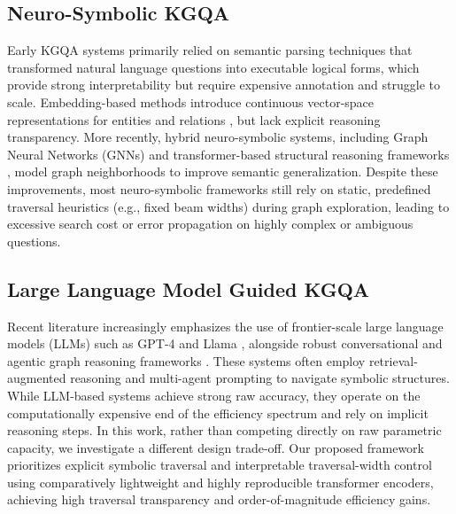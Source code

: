 \documentclass[10pt,conference]{IEEEtran}
\begin{document}
\subsection{Neuro-Symbolic KGQA}
Early KGQA systems primarily relied on semantic parsing techniques \cite{yih2015semantic, bao2016constraint} that transformed natural language questions into executable logical forms, which provide strong interpretability but require expensive annotation and struggle to scale. Embedding-based methods introduce continuous vector-space representations for entities and relations \cite{bordes2013translating, yang2014embedding, trouillon2016complex, sun2019rotate, saxena2020improving, sun2020faithful}, but lack explicit reasoning transparency. More recently, hybrid neuro-symbolic systems, including Graph Neural Networks (GNNs) \cite{kipf2016semi, velickovic2017graph, schlichtkrull2018modeling, yasunaga2021qa, zhang2022subgraph} and transformer-based structural reasoning frameworks \cite{liu2019roberta, jiang2023structgpt, wang2023knowledgpt, luo2024reasoning}, model graph neighborhoods to improve semantic generalization. Despite these improvements, most neuro-symbolic frameworks still rely on static, predefined traversal heuristics (e.g., fixed beam widths) during graph exploration, leading to excessive search cost or error propagation on highly complex or ambiguous questions.

\subsection{Large Language Model Guided KGQA}
Recent literature increasingly emphasizes the use of frontier-scale large language models (LLMs) such as GPT-4 \cite{achiam2023gpt} and Llama \cite{touvron2023llama}, alongside robust conversational and agentic graph reasoning frameworks \cite{christmann2024reign, chen2024search, chen2025drkg, zhao2025enrich}. These systems often employ retrieval-augmented reasoning and multi-agent prompting to navigate symbolic structures. While LLM-based systems achieve strong raw accuracy, they operate on the computationally expensive end of the efficiency spectrum and rely on implicit reasoning steps. In this work, rather than competing directly on raw parametric capacity, we investigate a different design trade-off. Our proposed framework prioritizes explicit symbolic traversal and interpretable traversal-width control using comparatively lightweight and highly reproducible transformer encoders, achieving high traversal transparency and order-of-magnitude efficiency gains.
\end{document}
